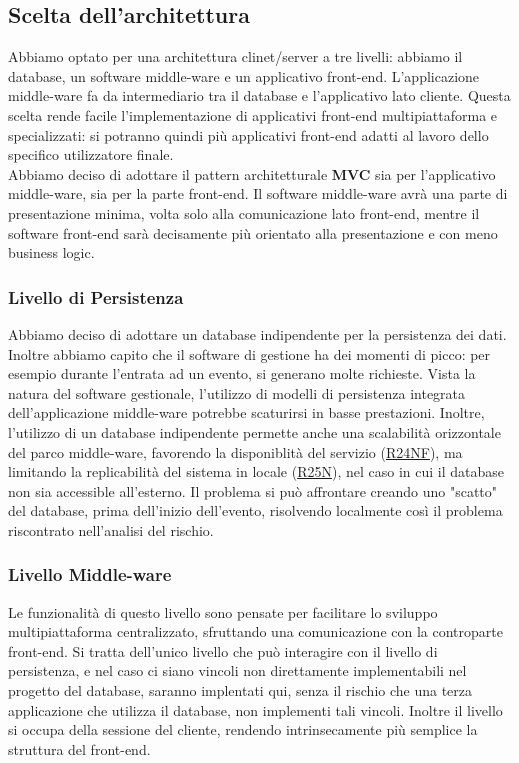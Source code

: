 \documentclass[a4paper]{article}
\begin{document}
\subsection{Scelta dell'architettura}
Abbiamo optato per una architettura clinet/server a tre livelli: abbiamo il database, un software middle-ware e un applicativo front-end. L'applicazione middle-ware fa da intermediario tra il database e l'applicativo lato cliente. Questa scelta rende facile l'implementazione di applicativi front-end multipiattaforma e specializzati: si potranno quindi più applicativi front-end adatti al lavoro dello specifico utilizzatore finale.\\Abbiamo deciso di adottare il pattern architetturale \textbf{MVC} sia per l'applicativo middle-ware, sia per la parte front-end. Il software middle-ware avrà una parte di presentazione minima, volta solo alla comunicazione lato front-end, mentre il software front-end sarà decisamente più orientato alla presentazione e con meno business logic.

\subsubsection{Livello di Persistenza}
Abbiamo deciso di adottare un database indipendente per la persistenza dei dati. Inoltre abbiamo capito che il software di gestione ha dei momenti di picco: per esempio durante l'entrata ad un evento, si generano molte richieste. Vista la natura del software gestionale, l'utilizzo di modelli di persistenza integrata dell'applicazione middle-ware potrebbe scaturirsi in basse prestazioni. Inoltre, l'utilizzo di un database indipendente permette anche una scalabilità orizzontale del parco middle-ware, favorendo la disponiblità del servizio (\hyperlink{R24NF}{R24NF}), ma limitando la replicabilità del sistema in locale (\hyperlink{R25NF}{R25N}), nel caso in cui il database non sia accessible all'esterno. Il problema si può affrontare creando uno "scatto" del database, prima dell'inizio dell'evento, risolvendo localmente così il problema riscontrato nell'analisi del rischio.


\subsubsection{Livello Middle-ware}
Le funzionalità di questo livello sono pensate per facilitare lo sviluppo multipiattaforma centralizzato, sfruttando una comunicazione con la controparte front-end. Si tratta dell'unico livello che può interagire con il livello di persistenza, e nel caso ci siano vincoli non direttamente implementabili nel progetto del database, saranno implentati qui, senza il rischio che una terza applicazione che utilizza il database, non implementi tali vincoli. Inoltre il livello si occupa della sessione del cliente, rendendo intrinsecamente più semplice la struttura del front-end.
\end{document}
